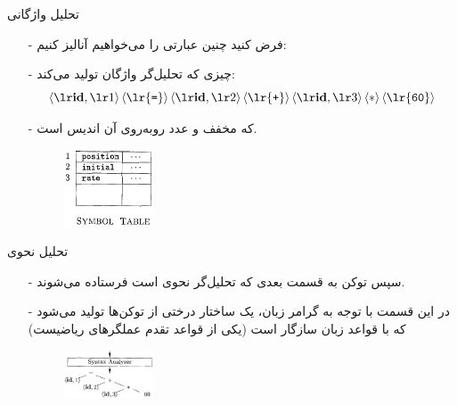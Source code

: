 \begin{frame}{تحلیل واژگانی }
\begin{itemize}\itemr
\item[-]
فرض کنید چنین عبارتی را می‌خواهیم آنالیز کنیم:

\begin{flushleft}
\end{flushleft}
\item[-]
چیزی که تحلیل‌گر واژگان تولید می‌کند:
\begin{equation*}
\token{1} 
\left\langle\text{\lr{\texttt{=}}}\right\rangle
\token{2}
\left\langle\text{\lr{\texttt{+}}}\right\rangle
\token{3}
\left\langle\ast\right\rangle
\left\langle\text{\lr{\texttt{60}}}\right\rangle
\end{equation*}

\item[-]
که 
مخفف 
و عدد روبه‌روی آن اندیس 
است.
\begin{figure}[H]
\begin{center}
\includegraphics[width=0.25\textwidth, height=0.3\textheight]{docs/images/symboltable}
\end{center}
\end{figure}
\end{itemize}
\end{frame}

\begin{frame}{تحلیل نحوی }
\begin{itemize}\itemr
\item[-]
سپس توکن به قسمت بعدی که تحلیل‌گر نحوی است فرستاده می‌شوند.

\item[-]
در این قسمت با توجه به گرامر زبان، یک ساختار درختی از توکن‌ها تولید می‌شود که با قواعد زبان سازگار است (یکی از قواعد تقدم عملگرهای ریاضیست)

\begin{figure}[H]
\begin{center}
\includegraphics[width=0.25\textwidth, height=0.31\textheight]{docs/images/syntax}
\end{center}
\end{figure}
\end{itemize}
\end{frame}